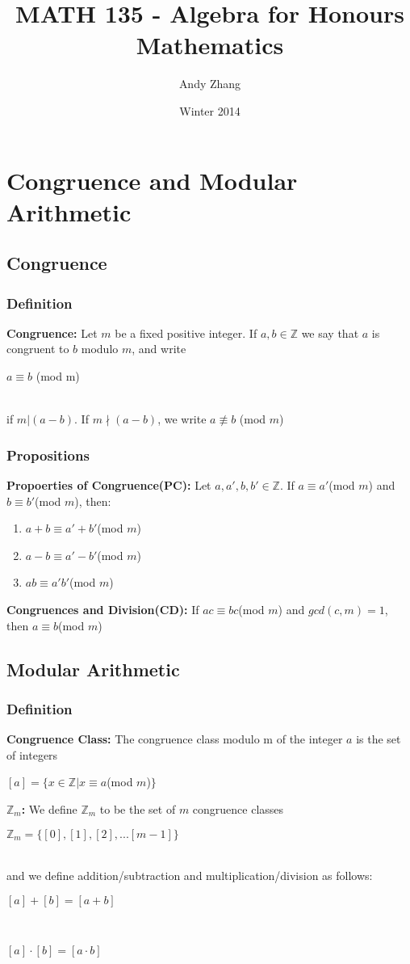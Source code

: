 \documentclass[12pt]{report}
\title{MATH 135 - Algebra for Honours Mathematics}
\author{Andy Zhang}
\date{Winter 2014}
\begin{document}
\maketitle
\tableofcontents
\chapter{Congruence and Modular Arithmetic}
	\section{Congruence}
		\subsection{Definition}
			\textbf{Congruence:} Let $m$ be a fixed positive integer. If $a, b \in \mathbb{Z}$ we say that $a$ is congruent to $b$ modulo $m$, and write \\
			\centerline{$a \equiv b$ (mod m)}\\
			if $m|(a-b)$. If $m \nmid (a-b)$, we write $a \not \equiv b$ (mod $m$)
		\subsection{Propositions}
			\textbf{Propoerties of Congruence(PC):} Let $a, a', b, b' \in \mathbb{Z}$. If $a \equiv a'$(mod $m$) and $b \equiv b' $(mod $m$), then:
			\begin{enumerate}
				\item $a+b \equiv a' + b'$(mod $m$)
				\item $a-b \equiv a' - b'$(mod $m$)
				\item $ab \equiv a'b'$(mod $m$)
			\end{enumerate}
			\textbf{Congruences and Division(CD):} If $ac \equiv bc$(mod $m$) and $gcd(c,m)=1$, then $a \equiv b$(mod $m$)
	\section{Modular Arithmetic}
		\subsection{Definition}
			\textbf{Congruence Class:} The congruence class modulo m of the integer $a$ is the set of integers \\
			\centerline{$[a] = \{x \in \mathbb{Z} | x \equiv a$(mod $m$)$\}$}
			\textbf{$\mathbb{Z}_m$:} We define $\mathbb{Z}_m$ to be the set of $m$ congruence classes\\
			\centerline{$\mathbb{Z}_m = \{[0],[1],[2],...[m-1]\}$} \\
			and we define addition/subtraction and multiplication/division as follows:\\
			\centerline{$[a] + [b] = [a+b]$}\\
			\centerline{$[a]\cdot[b] = [a\cdot b]$}
\end{document}
